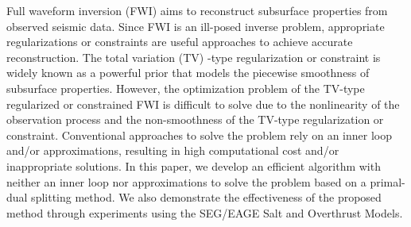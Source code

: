 \begin{summary}
Full waveform inversion (FWI) aims to reconstruct subsurface properties from observed seismic data.
Since FWI is an ill-posed inverse problem, appropriate regularizations or constraints are useful approaches to achieve accurate reconstruction.
The total variation (TV) -type regularization or constraint is widely known as a powerful prior that models the piecewise smoothness of subsurface properties.
However, the optimization problem of the TV-type regularized or constrained FWI is difficult to solve due to the nonlinearity of the observation process and the non-smoothness of the TV-type regularization or constraint.
Conventional approaches to solve the problem rely on an inner loop and/or approximations, resulting in high computational cost and/or inappropriate solutions.
In this paper, we develop an efficient algorithm with neither an inner loop nor approximations to solve the problem based on a primal-dual splitting method.
We also demonstrate the effectiveness of the proposed method through experiments using the SEG/EAGE Salt and Overthrust Models.
\end{summary}
